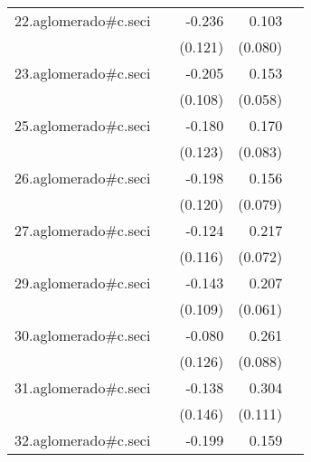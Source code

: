 {\begin{longtable}{l*{4}{D{.}{.}{-1}}}
\addlinespace
22.aglomerado#c.seci&                     &      -0.236         &       0.103         &                     \\
            &                     &     (0.121)         &     (0.080)         &                     \\
\addlinespace
23.aglomerado#c.seci&                     &      -0.205         &       0.153\sym{**} &                     \\
            &                     &     (0.108)         &     (0.058)         &                     \\
\addlinespace
25.aglomerado#c.seci&                     &      -0.180         &       0.170\sym{*}  &                     \\
            &                     &     (0.123)         &     (0.083)         &                     \\
\addlinespace
26.aglomerado#c.seci&                     &      -0.198         &       0.156\sym{*}  &                     \\
            &                     &     (0.120)         &     (0.079)         &                     \\
\addlinespace
27.aglomerado#c.seci&                     &      -0.124         &       0.217\sym{**} &                     \\
            &                     &     (0.116)         &     (0.072)         &                     \\
\addlinespace
29.aglomerado#c.seci&                     &      -0.143         &       0.207\sym{***}&                     \\
            &                     &     (0.109)         &     (0.061)         &                     \\
\addlinespace
30.aglomerado#c.seci&                     &      -0.080         &       0.261\sym{**} &                     \\
            &                     &     (0.126)         &     (0.088)         &                     \\
\addlinespace
31.aglomerado#c.seci&                     &      -0.138         &       0.304\sym{**} &                     \\
            &                     &     (0.146)         &     (0.111)         &                     \\
\addlinespace
32.aglomerado#c.seci&                     &      -0.199         &       0.159         &                     \\

\end{longtable}}
